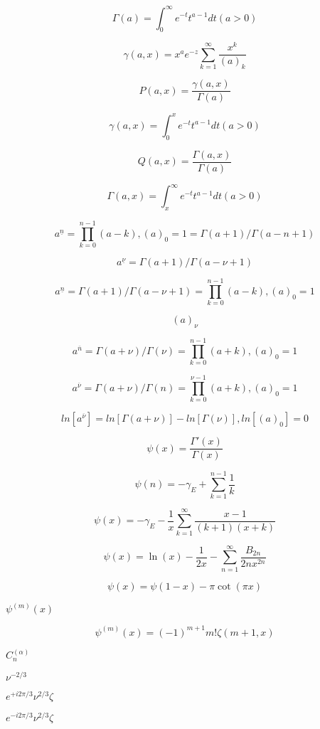 \documentclass{article}
\begin{document}
\[ \Gamma(a) = \int_0^\infty e^{-t}t^{a-1}dt (a > 0) \]
\pagebreak

\[ \gamma(a,x) = x^a e^{-z}\sum_{k=1}^{\infty} \frac{x^k}{(a)_k} \]
\pagebreak

\[ P(a,x) = \frac{\gamma(a,x)}{\Gamma(a)} \]
\pagebreak

\[ \gamma(a,x) = \int_0^x e^{-t}t^{a-1}dt (a > 0) \]
\pagebreak

\[ Q(a,x) = \frac{\Gamma(a,x)}{\Gamma(a)} \]
\pagebreak

\[ \Gamma(a,x) = \int_x^\infty e^{-t}t^{a-1}dt (a > 0) \]
\pagebreak

\[ a^{\underline{n}} = \prod_{k=0}^{n-1} (a - k), (a)_0 = 1 = \Gamma(a + 1) / \Gamma(a - n + 1) \]
\pagebreak

\[ a^{\underline{\nu}} = \Gamma(a + 1) / \Gamma(a - \nu + 1) \]
\pagebreak

\[ a^{\underline{n}} = \Gamma(a + 1) / \Gamma(a - \nu + 1) = \prod_{k=0}^{n-1} (a - k), (a)_0 = 1 \]
\pagebreak

\[ (a)_\nu \]
\pagebreak

\[ a^{\overline{n}} = \Gamma(a + \nu) / \Gamma(\nu) = \prod_{k=0}^{n-1} (a + k), (a)_0 = 1 \]
\pagebreak

\[ a^{\overline{\nu}} = \Gamma(a + \nu) / \Gamma(n) = \prod_{k=0}^{\nu-1} (a + k), (a)_0 = 1 \]
\pagebreak

\[ ln[a^{\overline{\nu}}] = ln[\Gamma(a + \nu)] - ln[\Gamma(\nu)], ln[(a)_0] = 0 \]
\pagebreak

\[ \psi(x) = \frac{\Gamma'(x)}{\Gamma(x)} \]
\pagebreak

\[ \psi(n) = -\gamma_E + \sum_{k=1}^{n-1} \frac{1}{k} \]
\pagebreak

\[ \psi(x) = -\gamma_E - \frac{1}{x} \sum_{k=1}^{\infty} \frac{x - 1}{(k + 1)(x + k)} \]
\pagebreak

\[ \psi(x) = \ln(x) - \frac{1}{2x} - \sum_{n=1}^{\infty} \frac{B_{2n}}{2 n x^{2n}} \]
\pagebreak

\[ \psi(x) = \psi(1-x) - \pi \cot(\pi x) \]
\pagebreak

$ \psi^{(m)}(x) $
\pagebreak

\[ \psi^{(m)}(x) = (-1)^{m+1} m! \zeta(m+1,x) \]
\pagebreak

$ C_n^{(\alpha)}$
\pagebreak

$ \nu^{-2/3} $
\pagebreak

$ e^{+i2\pi/3} \nu^{2/3} \zeta $
\pagebreak

$ e^{-i2\pi/3} \nu^{2/3} \zeta $
\pagebreak
\end{document}
